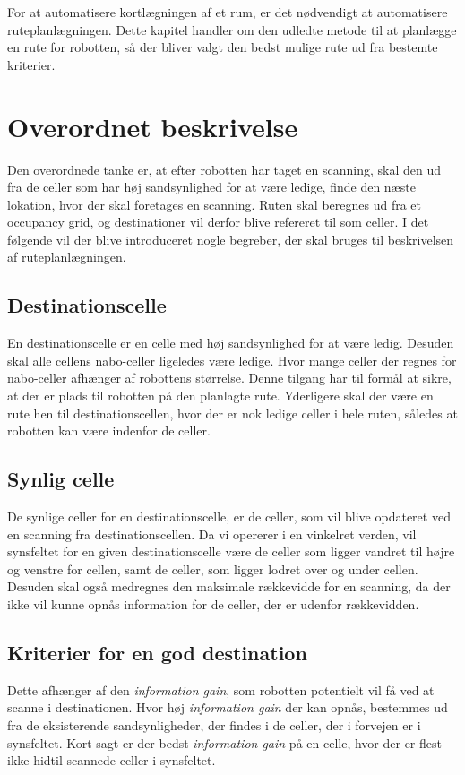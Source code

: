 \label{ruteplanleagning}
For at automatisere kortlægningen af et rum, er det nødvendigt at automatisere ruteplanlægningen.
Dette kapitel handler om den udledte metode til at planlægge en rute for robotten, så der bliver valgt den bedst mulige rute ud fra bestemte kriterier.

\section{Overordnet beskrivelse}\label{rute:main}
Den overordnede tanke er, at efter robotten har taget en scanning, skal den ud fra de celler som har høj sandsynlighed for at være ledige, finde den næste lokation, hvor der skal foretages en scanning.
Ruten skal beregnes ud fra et occupancy grid, og destinationer vil derfor blive refereret til som celler.
I det følgende vil der blive introduceret nogle begreber, der skal bruges til beskrivelsen af ruteplanlægningen.

\subsection{Destinationscelle}\label{rute:destinationscelle}
En destinationscelle er en celle med høj sandsynlighed for at være ledig.
Desuden skal alle cellens nabo-celler ligeledes være ledige.
Hvor mange celler der regnes for nabo-celler afhænger af robottens størrelse.
Denne tilgang har til formål at sikre, at der er plads til robotten på den planlagte rute.
Yderligere skal der være en rute hen til destinationscellen, hvor der er nok ledige celler i hele ruten, således at robotten kan være indenfor de celler.

\subsection{Synlig celle}\label{rute:synligcelle}
De synlige celler for en destinationscelle, er de celler, som vil blive opdateret ved en scanning fra destinationscellen.
Da vi opererer i en vinkelret verden, vil synsfeltet for en given destinationscelle være de celler som ligger vandret til højre og venstre for cellen, samt de celler, som ligger lodret over og under cellen.
Desuden skal også medregnes den maksimale rækkevidde for en scanning, da der ikke vil kunne opnås information for de celler, der er udenfor rækkevidden.

\subsection{Kriterier for en god destination}
Dette afhænger af den \textit{information gain}, som robotten potentielt vil få ved at scanne i destinationen.
Hvor høj \textit{information gain} der kan opnås, bestemmes ud fra de eksisterende sandsynligheder, der findes i de celler, der i forvejen er i synsfeltet.
Kort sagt er der bedst \textit{information gain} på en celle, hvor der er flest ikke-hidtil-scannede celler i synsfeltet.

